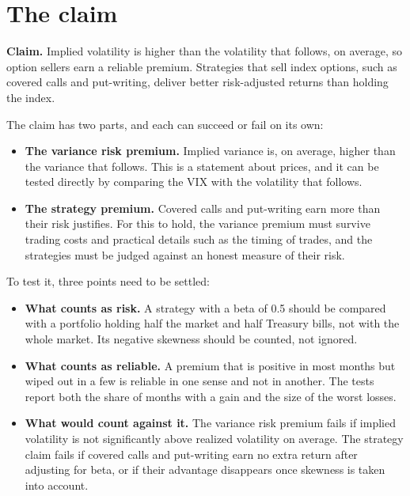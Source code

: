 \section{The claim}
\label{sec:16-claim}

\begin{callout}
\textbf{Claim.} Implied volatility is higher than the volatility that follows, on average, so option sellers earn a reliable premium. Strategies that sell index options, such as covered calls and put-writing, deliver better risk-adjusted returns than holding the index.
\end{callout}

The claim has two parts, and each can succeed or fail on its own:

\begin{itemize}
  \item \textbf{The variance risk premium.} Implied variance is, on average, higher than the variance that follows. This is a statement about prices, and it can be tested directly by comparing the VIX with the volatility that follows.
  \item \textbf{The strategy premium.} Covered calls and put-writing earn more than their risk justifies. For this to hold, the variance premium must survive trading costs and practical details such as the timing of trades, and the strategies must be judged against an honest measure of their risk.
\end{itemize}

To test it, three points need to be settled:

\begin{itemize}
  \item \textbf{What counts as risk.} A strategy with a beta of 0.5 should be compared with a portfolio holding half the market and half Treasury bills, not with the whole market. Its negative skewness should be counted, not ignored.
  \item \textbf{What counts as reliable.} A premium that is positive in most months but wiped out in a few is reliable in one sense and not in another. The tests report both the share of months with a gain and the size of the worst losses.
  \item \textbf{What would count against it.} The variance risk premium fails if implied volatility is not significantly above realized volatility on average. The strategy claim fails if covered calls and put-writing earn no extra return after adjusting for beta, or if their advantage disappears once skewness is taken into account.
\end{itemize}

